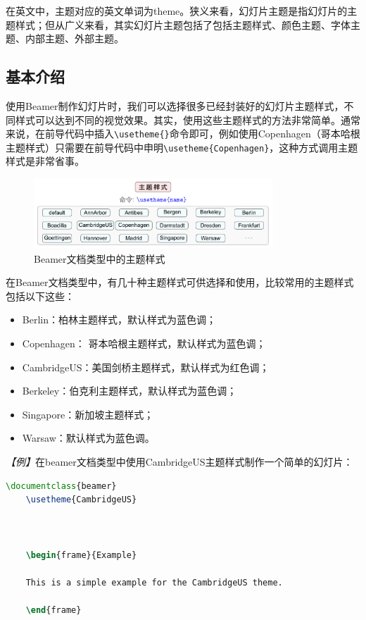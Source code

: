 在英文中，主题对应的英文单词为theme。狭义来看，幻灯片主题是指幻灯片的主题样式；但从广义来看，其实幻灯片主题包括了包括主题样式、颜色主题、字体主题、内部主题、外部主题。

\subsection{基本介绍}

使用Beamer制作幻灯片时，我们可以选择很多已经封装好的幻灯片主题样式，不同样式可以达到不同的视觉效果。其实，使用这些主题样式的方法非常简单。通常来说，在前导代码中插入\texttt{\textbackslash{}usetheme\{\}}命令即可，例如使用Copenhagen（哥本哈根主题样式）只需要在前导代码中申明\texttt{\textbackslash{}usetheme\{Copenhagen\}}，这种方式调用主题样式是非常省事。

\begin{figure}[htbp]
    \centering
    \includegraphics[width = 0.8\textwidth]{images/ch_9/beamer_theme.pdf}
    \caption{Beamer文档类型中的主题样式}
    \label{figeg:001}
\end{figure}

在Beamer文档类型中，有几十种主题样式可供选择和使用，比较常用的主题样式包括以下这些：
\begin{itemize}
    \item Berlin：柏林主题样式，默认样式为蓝色调；
    \item Copenhagen： 哥本哈根主题样式，默认样式为蓝色调；
    \item CambridgeUS：美国剑桥主题样式，默认样式为红色调；
    \item Berkeley：伯克利主题样式，默认样式为蓝色调；
    \item Singapore：新加坡主题样式；
    \item Warsaw：默认样式为蓝色调。
\end{itemize}

\emph{【例】}在beamer文档类型中使用CambridgeUS主题样式制作一个简单的幻灯片：
\begin{lstlisting}[language=TeX]
    \documentclass{beamer}
    \usetheme{CambridgeUS}
    
    
    
    \begin{frame}{Example}
    
    This is a simple example for the CambridgeUS theme.
    
    \end{frame}
    
    
\end{lstlisting}

